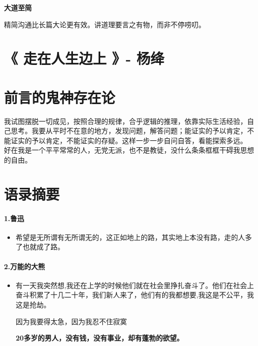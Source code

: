 \documentclass[UTF8,a4paper,8pt]{ctexart}
\begin{document}
 \textbf{大道至简}
 
 精简沟通比长篇大论更有效。讲道理要言之有物，而非不停唠叨。	
 \newpage 
 \section{《 走在人生边上 》- 杨绛 }
 \section{前言的鬼神存在论}
 我试图摆脱一切成见，按照合理的规律，合乎逻辑的推理，依靠实际生活经验，自己思考。我要从平时不在意的地方，发现问题，解答问题；能证实的予以肯定，不能证实的予以肯定，不能证实的存疑。这样一步一步自问自答，看能探索多远。
 好在我是一个平平常常的人，无党无派，也不是教徒，没什么条条框框干碍我思想的自由。
 
 \newpage
 \section{语录摘要}
 \paragraph{1.鲁迅}
 
 \begin{itemize}
 	\item 希望是无所谓有无所谓无的，这正如地上的路，其实地上本没有路，走的人多了也就成了路。
 \end{itemize}
 
 \paragraph{2.万能的大熊}
 \begin{itemize}
 	\item 有一天我突然想,我还在上学的时候他们就在社会里挣扎奋斗了。他们在社会上奋斗积累了十几二十年，我们新人来了，他们有的我都想要,我这是不公平，我这是抢劫。 
 	
 	因为我要得太急，因为我忍不住寂寞
 	
 	\textbf{20多岁的男人，没有钱，没有事业，却有蓬勃的欲望。}
 \end{itemize}
 
\end{document}
